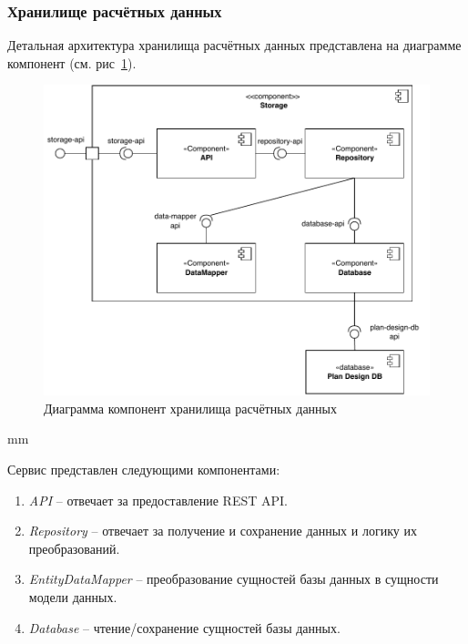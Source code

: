 \subsubsection{\large{Хранилище расчётных данных}}

Детальная архитектура хранилища расчётных данных представлена на диаграмме компонент
(см. рис\ \ref{pic:architecture__storage-component}).

\begin{figure}[H]
	\hspace*{-2.5 cm}\includegraphics[width=\textwidth]{architecture/pictures/storage/component_common}
	\caption{Диаграмма компонент хранилища расчётных данных}
	\label{pic:architecture__storage-component}
\end{figure}
 mm

Сервис представлен следующими компонентами:
\begin{enumerate}
	\item {
		\textit{API} -- отвечает за предоставление REST API.
	}
	\item {
		\textit{Repository} -- отвечает за получение и сохранение данных и логику их преобразований.
	}
	\item {
		\textit{EntityDataMapper} -- преобразование сущностей базы данных в сущности модели данных.
	}
	\item {
		\textit{Database} -- чтение/сохранение сущностей базы данных.
	}
\end{enumerate}